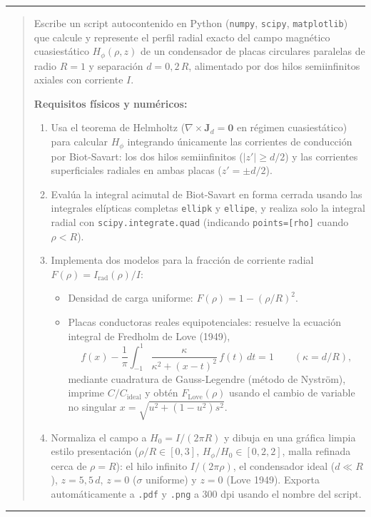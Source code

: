 \documentclass[11pt]{article}
\begin{document}
\noindent\color{mutedgray}\rule{\linewidth}{0.5pt}\color{black}
\begin{quote}
Escribe un script autocontenido en Python (\texttt{numpy}, \texttt{scipy}, \texttt{matplotlib}) que calcule y represente el perfil radial exacto del campo magnético cuasiestático $H_\phi(\rho, z)$ de un condensador de placas circulares paralelas de radio $R=1$ y separación $d = 0{,}2\,R$, alimentado por dos hilos semiinfinitos axiales con corriente $I$.

\textbf{Requisitos físicos y numéricos:}
\begin{enumerate}
    \item Usa el teorema de Helmholtz ($\nabla \times \mathbf{J}_d = \mathbf{0}$ en régimen cuasiestático) para calcular $H_\phi$ integrando únicamente las corrientes de conducción por Biot-Savart: los dos hilos semiinfinitos ($|z'| \ge d/2$) y las corrientes superficiales radiales en ambas placas ($z' = \pm d/2$).
    \item Evalúa la integral acimutal de Biot-Savart en forma cerrada usando las integrales elípticas completas \texttt{ellipk} y \texttt{ellipe}, y realiza solo la integral radial con \texttt{scipy.integrate.quad} (indicando \texttt{points=[rho]} cuando $\rho < R$).
    \item Implementa dos modelos para la fracción de corriente radial $F(\rho) = I_{\mathrm{rad}}(\rho)/I$:
    \begin{itemize}
        \item Densidad de carga uniforme: $F(\rho) = 1 - (\rho/R)^2$.
        \item Placas conductoras reales equipotenciales: resuelve la ecuación integral de Fredholm de Love (1949),
        \[
            f(x) - \frac{1}{\pi}\int_{-1}^{1}\frac{\kappa}{\kappa^2 + (x - t)^2}\,f(t)\,dt = 1 \qquad (\kappa = d/R),
        \]
        mediante cuadratura de Gauss-Legendre (método de Nyström), imprime $C/C_{\mathrm{ideal}}$ y obtén $F_{\mathrm{Love}}(\rho)$ usando el cambio de variable no singular $x = \sqrt{u^2 + (1 - u^2)s^2}$.
    \end{itemize}
    \item Normaliza el campo a $H_0 = I/(2\pi R)$ y dibuja en una gráfica limpia estilo presentación ($\rho/R \in [0, 3]$, $H_\phi/H_0 \in [0, 2{,}2]$, malla refinada cerca de $\rho = R$): el hilo infinito $I/(2\pi\rho)$, el condensador ideal ($d \ll R$), $z = 5{,}5\,d$, $z = 0$ ($\sigma$ uniforme) y $z = 0$ (Love 1949). Exporta automáticamente a \texttt{.pdf} y \texttt{.png} a 300 dpi usando el nombre del script.
\end{enumerate}
\end{quote}
\noindent\color{mutedgray}\rule{\linewidth}{0.5pt}\color{black}
\end{document}

